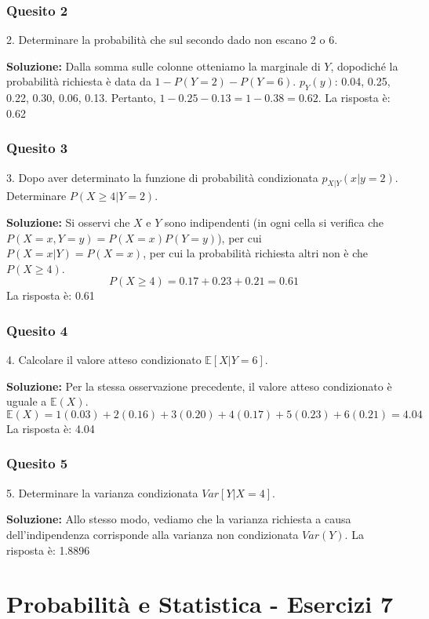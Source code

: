 \documentclass[12pt, a4paper]{article}
\begin{document}
\subsubsection*{Quesito 2}
2. Determinare la probabilità che sul secondo dado non escano 2 o 6.

\textbf{Soluzione:}
Dalla somma sulle colonne otteniamo la marginale di $Y$, dopodiché la probabilità richiesta è data da $1 - P(Y=2) - P(Y=6)$.
$p_Y(y)$: 0.04, 0.25, 0.22, 0.30, 0.06, 0.13.
Pertanto, $1 - 0.25 - 0.13 = 1 - 0.38 = 0.62$.
La risposta è: 0.62

\subsubsection*{Quesito 3}
3. Dopo aver determinato la funzione di probabilità condizionata $p_{X|Y}(x|y=2)$. Determinare $P(X \geq 4|Y=2)$.

\textbf{Soluzione:}
Si osservi che $X$ e $Y$ sono indipendenti (in ogni cella si verifica che $P(X=x, Y=y) = P(X=x)P(Y=y)$), per cui $P(X=x|Y) = P(X=x)$, per cui la probabilità richiesta altri non è che $P(X \geq 4)$.
$$ P(X \geq 4) = 0.17 + 0.23 + 0.21 = 0.61 $$
La risposta è: 0.61

\subsubsection*{Quesito 4}
4. Calcolare il valore atteso condizionato $\mathbb{E}[X|Y=6]$.

\textbf{Soluzione:}
Per la stessa osservazione precedente, il valore atteso condizionato è uguale a $\mathbb{E}(X)$.
$$ \mathbb{E}(X) = 1(0.03) + 2(0.16) + 3(0.20) + 4(0.17) + 5(0.23) + 6(0.21) = 4.04 $$
La risposta è: 4.04

\subsubsection*{Quesito 5}
5. Determinare la varianza condizionata $Var[Y|X=4]$.

\textbf{Soluzione:}
Allo stesso modo, vediamo che la varianza richiesta a causa dell'indipendenza corrisponde alla varianza non condizionata $Var(Y)$.
La risposta è: 1.8896

\newpage

\section*{Probabilità e Statistica - Esercizi 7}
\end{document}
